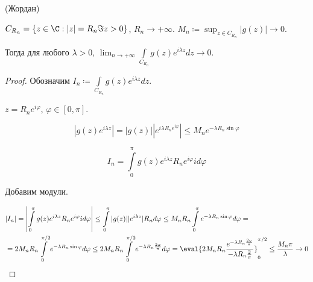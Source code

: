\begin{lemma}(Жордан)

    $C_{R_n} = \left\{z \in \C : |z| = R_n \Im z > 0\right\}$,
    $R_n \to +\infty$. $M_n \coloneqq \sup_{z\in C_{R_n}} |g(z)| \to 0$.

    Тогда для любого $\lambda > 0$, $\lim_{n\to +\infty}
        \int\limits_{C_{R_n}} g(z)e^{i\lambda z} dz \to 0$.
\end{lemma}

\begin{proof}
    Обозначим $I_n \coloneqq \int\limits_{C_{R_n}} g(z)e^{i\lambda z} dz$.

    $z = R_ne^{i\varphi}$, $\varphi \in \left[0, \pi\right]$.

    \[|g(z) e^{i\lambda z}| = |g(z)| |e^{i\lambda R_n e^{i\varphi} } |
        \le M_n e^{-\lambda R_n \sin \varphi}\]

    \[I_n = \int\limits_0^{\pi} g(z) e^{i\lambda z} R_n e^{i\varphi}
        i d\varphi\]

    Добавим модули.

    \[
        \begin{aligned}[t]
             & |I_n| = \left| \int\limits_0^{\pi} g(z) e^{i\lambda z} R_n e^{i\varphi}
            i d\varphi \right|
            \le \int\limits_0^\pi |g(z)| |e^{i\lambda z}| R_n d\varphi \le M_nR_n
            \int\limits_0^\pi e^{-\lambda R_n \sin\varphi} d\varphi =                  \\
             & = 2M_nR_n
            \int\limits_0^{\pi/2} e^{-\lambda R_n \sin\varphi} d\varphi
            \le 2M_nR_n\int\limits_0^{\pi/2} e^{-\lambda R_n\frac{2\varphi}{\pi}} d\varphi
            = \eval{2M_nR_n \frac{e^{-\lambda R_n \frac{2\varphi}{\pi}}}{-\lambda R_n \frac{2}{\pi}}
            }_0^{\pi/2} \le \frac{M_n \pi}{\lambda} \to 0
        \end{aligned}
    \]
\end{proof}

